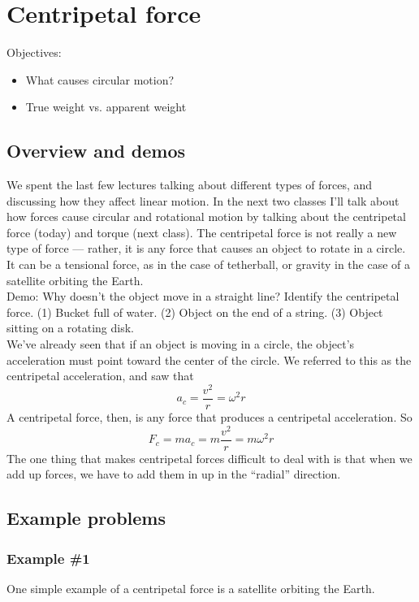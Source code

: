 \section{Centripetal force}
Objectives:
\begin{itemize}
\item What causes circular motion?
\item True weight vs. apparent weight
\end{itemize}

\hrulefill

\subsection{Overview and demos}
We spent the last few lectures talking about different types of forces, and discussing how they affect linear motion. In the next two classes I'll talk about how forces cause circular and rotational motion by talking about the centripetal force (today) and torque (next class). The centripetal force is not really a new type of force --- rather, it is any force that causes an object to rotate in a circle. It can be a tensional force, as in the case of tetherball, or gravity in the case of a satellite orbiting the Earth.\\

Demo: Why doesn't the object move in a straight line? Identify the centripetal force. (1) Bucket full of water. (2) Object on the end of a string. (3) Object sitting on a rotating disk.\\


We've already seen that if an object is moving in a circle, the object's acceleration must point toward the center of the circle. We referred to this as the centripetal acceleration, and saw that
$$a_c=\frac{v^2}{r}=\omega^2r$$
A centripetal force, then, is any force that produces a centripetal acceleration. So
$$F_c=ma_c=m\frac{v^2}{r}=m\omega^2r$$
The one thing that makes centripetal forces difficult to deal with is that when we add up forces, we have to add them in up in the ``radial'' direction.

\subsection{Example problems}
\subsubsection{Example \#1}
One simple example of a centripetal force is a satellite orbiting the Earth.

